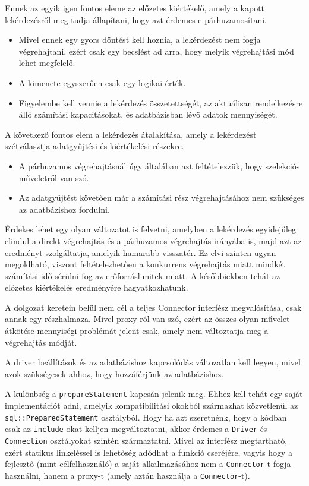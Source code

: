 Ennek az egyik igen fontos eleme az előzetes kiértékelő, amely a kapott lekérdezésről meg tudja állapítani, hogy azt érdemes-e párhuzamosítani.
\begin{itemize}
	\item Mivel ennek egy gyors döntést kell hoznia, a lekérdezést nem fogja végrehajtani, ezért csak egy becslést ad arra, hogy melyik végrehajtási mód lehet megfelelő.
	\item A kimenete egyszerűen csak egy logikai érték.
	\item Figyelembe kell vennie a lekérdezés összetettségét, az aktuálisan rendelkezésre álló számítási kapacitásokat, és adatbázisban lévő adatok mennyiségét.
\end{itemize}

A következő fontos elem a lekérdezés átalakítása, amely a lekérdezést szétválasztja adatgyűjtési és kiértékelési részekre.
\begin{itemize}
	\item A párhuzamos végrehajtásnál úgy általában azt feltételezzük, hogy szelekciós műveletről van szó.
	\item Az adatgyűjtést követően már a számítási rész végrehajtásához nem szükséges az adatbázishoz fordulni.
\end{itemize}

Érdekes lehet egy olyan változatot is felvetni, amelyben a lekérdezés egyidejűleg elindul a direkt végrehajtás és a párhuzamos végrehajtás irányába is, majd azt az eredményt szolgáltatja, amelyik hamarabb visszatér. Ez elvi szinten ugyan megoldható, viszont feltételezhetően a konkurrens végrehajtás miatt mindkét számítási idő sérülni fog az erőforráslimitek miatt. A későbbiekben tehát az előzetes kiértékelés eredményére hagyatkozhatunk.


A dolgozat keretein belül nem cél a teljes Connector interfész megvalósítása, csak annak egy részhalmaza. Mivel proxy-ról van szó, ezért az összes olyan művelet átkötése mennyiségi problémát jelent csak, amely nem változtatja meg a végrehajtás módját.

A driver beállítások és az adatbázishoz kapcsolódás változatlan kell legyen, mivel azok szükségesek ahhoz, hogy hozzáférjünk az adatbázishoz.

A különbség a \texttt{prepareStatement} kapcsán jelenik meg. Ehhez kell tehát egy saját implementációt adni, amelyik kompatibilitási okokból származhat közvetlenül az \texttt{sql::PreparedStatement} osztályból. Hogy ha azt szeretnénk, hogy a kódban csak az \texttt{include}-okat kelljen megváltoztatni, akkor érdemes a \texttt{Driver} és \texttt{Connection} osztályokat szintén származtatni. Mivel az interfész megtartható, ezért statikus linkeléssel is lehetőség adódhat a funkció cseréjére, vagyis hogy a fejlesztő (mint célfelhasználó) a saját alkalmazásához nem a \texttt{Connector}-t fogja használni, hanem a proxy-t (amely aztán használja a \texttt{Connector}-t).

